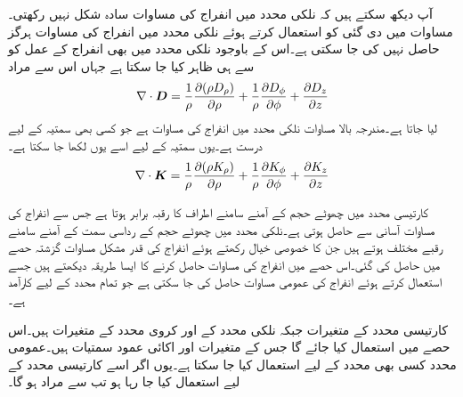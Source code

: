 آپ دیکھ سکتے ہیں کہ نلکی محدد میں انفراج کی مساوات سادہ شکل نہیں رکھتی۔مساوات  میں دی گئی  کو استعمال کرتے ہوئے نلکی محدد میں انفراج کی مساوات ہرگز حاصل نہیں کی جا سکتی ہے۔اس کے باوجود نلکی محدد میں بھی انفراج کے عمل کو  سے ہی ظاہر کیا جا سکتا ہے جہاں اس سے مراد
\begin{align}\label{مساوات_گاوس_نلکی_پھیلاو}
\nabla \cdot {\ensuremath{{\boldsymbol{D}}}}=\frac{1}{\rho}\frac{\partial (\rho D_{\rho})}{\partial \rho}+\frac{1}{\rho}\frac{\partial D_{\phi}}{\partial \phi}  +  \frac{\partial D_{z}}{\partial z}
\end{align}
لیا جاتا ہے۔مندرجہ بالا مساوات نلکی محدد میں انفراج کی مساوات ہے جو کسی بھی سمتیہ کے لیے درست ہے۔یوں سمتیہ  کے لیے اسے یوں لکھا جا سکتا ہے۔
 \begin{align}\label{مساوات_گاوس_نلکی_عمومی_پھیلاو}
\nabla \cdot {\ensuremath{{\boldsymbol{K}}}}=\frac{1}{\rho}\frac{\partial (\rho K_{\rho})}{\partial \rho}+\frac{1}{\rho}\frac{\partial K_{\phi}}{\partial \phi}  +  \frac{\partial K_{z}}{\partial z}
\end{align}


کارتیسی محدد میں چھوٹے حجم کے آمنے سامنے اطراف کا رقبہ برابر ہوتا ہے جس سے انفراج کی مساوات آسانی سے حاصل ہوتی ہے۔نلکی محدد میں چھوٹے حجم کے رداسی سمت کے آمنے سامنے رقبے مختلف ہوتے ہیں جن کا خصوصی خیال رکھتے ہوئے انفراج کی قدر مشکل مساوات گزشتہ حصے میں حاصل کی گئی۔اس حصے میں انفراج کی مساوات حاصل کرنے کا ایسا طریقہ دیکھتے ہیں جسے استعمال کرتے ہوئے انفراج کی عمومی مساوات حاصل کی جا سکتی ہے جو تمام محدد کے لیے کارآمد ہے۔

کارتیسی محدد کے متغیرات  جبکہ نلکی محدد کے   اور کروی محدد  کے متغیرات  ہیں۔اس حصے میں   استعمال کیا جائے گا جس کے متغیرات   اور   اکائی  عمود سمتیات  ہیں۔عمومی محدد کسی بھی محدد کے لیے استعمال کیا جا سکتا ہے۔یوں اگر اسے کارتیسی محدد کے لیے استعمال کیا جا رہا ہو تب   سے مراد  ہو گا۔
 

